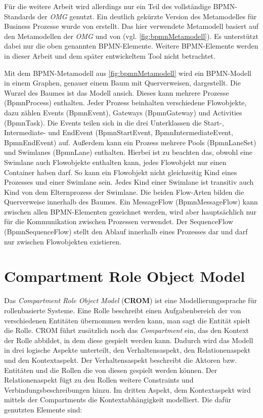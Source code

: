 Für die weitere Arbeit wird allerdings nur ein Teil des vollständige BPMN-Standards der \emph{OMG} genutzt.
Ein deutlich gekürzte Version des Metamodelles für Business Prozesse wurde von \cite{Loja2010} erstellt.
Das hier verwendete Metamodell basiert auf den Metamodellen der \emph{OMG} und von \cite{Loja2010} (vgl. \cref{fig:bpmnMetamodell}).
Es unterstützt dabei nur die oben genannten BPMN-Elemente.
Weitere BPMN-Elemente werden in dieser Arbeit und dem später entwickeltem Tool nicht betrachtet.

Mit dem BPMN-Metamodell aus \cref{fig:bpmnMetamodell} wird ein BPMN-Modell in einem Graphen, genauer einem Baum mit Querverweisen, dargestellt.
Die Wurzel des Baumes ist das Modell ansich.
Dieses kann mehrere Prozesse (BpmnProcess) enthalten.
Jeder Prozess beinhalten verschiedene Flowobjekte, dazu zählen Events (BpmnEvent), Gateways (BpmnGateway) und Activities (BpmnTask).
Die Events teilen sich in die drei Unterklassen die Start-, Intermediate- und EndEvent (BpmnStartEvent, BpmnIntermediateEvent, BpmnEndEvent) auf.
Außerdem kann ein Prozess mehrere Pools (BpmnLaneSet) und Swimlanes (BpmnLane) enthalten.
Hierbei ist zu beachten das, obwohl eine Swimlane auch Flowobjekte enthalten kann, jedes Flowobjekt nur einen Container haben darf.
So kann ein Flowobjekt nicht gleichzeitig Kind eines Prozesses und einer Swimlane sein.
Jedes Kind einer Swimlane ist transitiv auch Kind von dem Elternprozess der Swimlane.
Die beiden Flow-Arten bilden die Querverweise innerhalb des Baumes.
Ein MessageFlow (BpmnMessageFlow) kann zwischen allen BPMN-Elementen gezeichnet werden, wird aber hauptsächlich nur für die Kommunikation zwischen Prozessen verwendet.
Der SequenceFlow (BpmnSequenceFlow) stellt den Ablauf innerhalb eines Prozesses dar und darf nur zwischen Flowobjekten existieren.

\section{Compartment Role Object Model}

Das \emph{Compartment Role Object Model} (\textbf{CROM}) ist eine Modellierungssprache für rollenbasierte Systeme.
Eine Rolle beschreibt einen Aufgabenbereich der von verschiedenen Entitäten übernommen werden kann, man sagt die Entität spielt die Rolle.
CROM führt zusätzlich noch das \emph{Compartment} ein, das den Kontext der Rolle abbildet, in dem diese gespielt werden kann.
Dadurch wird das Modell in drei logische Aspekte unterteilt, den Verhaltensaspekt, den Relationenaspekt und den Kontextaspekt.
Der Verhaltensaspekt beschreibt die Aktoren bzw. Entitäten und die Rollen die von diesen gespielt werden können.
Der Relationenaspekt fügt zu den Rollen weitere Constraints und Verbindungsbeschreibungen hinzu.
Im dritten Aspekt, dem Kontextaspekt wird mittels der Compartments die Kontextabhängigkeit modelliert.
Die dafür genutzten Elemente sind:

